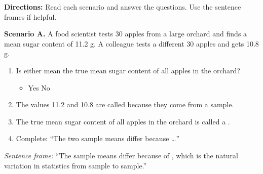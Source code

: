 \documentclass[10pt]{article}
\begin{document}
\namepartnerperiod

\vspace{0.15in}

\begin{tcolorbox}[colback=redbg, colframe=black!40, boxrule=0.6pt, arc=2mm,
    left=3mm, right=3mm, top=2mm, bottom=2mm, title=\textbf{Tier R --- Remediate}]
\textbf{Directions:} Read each scenario and answer the questions. Use the sentence
frames if helpful.

\textbf{Scenario A.} A food scientist tests 30 apples from a large orchard and finds
a mean sugar content of 11.2 g. A colleague tests a different 30 apples and gets 10.8 g.

\begin{enumerate}
  \item Is either mean the true mean sugar content of all apples in the orchard?
        \begin{itemize}
          \item[$\square$] Yes \quad \ans{$\checkmark$} No
        \end{itemize}
  \item The values 11.2 and 10.8 are called  because they come from a
        sample.
  \item The true mean sugar content of all apples in the orchard is called a
        .
  \item Complete: ``The two sample means differ because \ldots'' 
\end{enumerate}

\vspace{0.06in}
\textit{Sentence frame:} ``The sample means differ because of , which is the
natural variation in statistics from sample to sample.''
\end{tcolorbox}

\vspace{0.1in}
\end{document}
